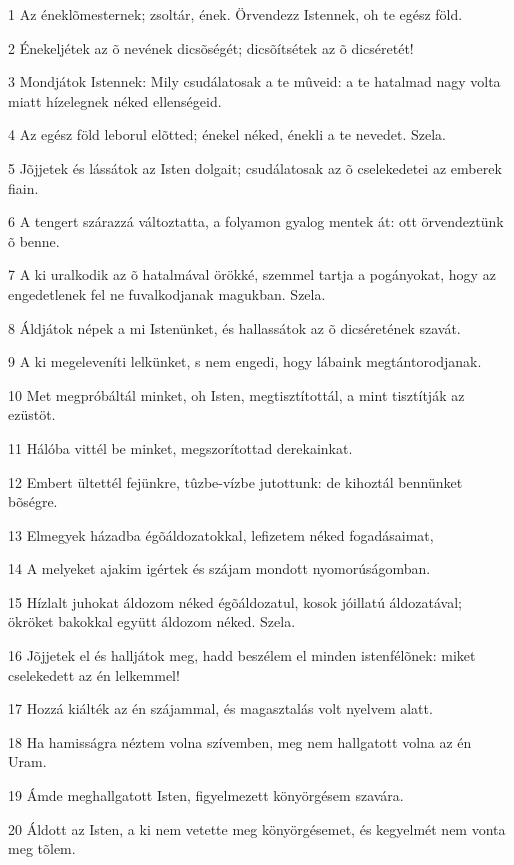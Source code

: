 \par 1 Az éneklõmesternek; zsoltár, ének. Örvendezz Istennek, oh te egész föld.
\par 2 Énekeljétek az õ nevének dicsõségét; dicsõítsétek az õ dicséretét!
\par 3 Mondjátok Istennek: Mily csudálatosak a te mûveid: a te hatalmad nagy volta miatt hízelegnek néked ellenségeid.
\par 4 Az egész föld leborul elõtted; énekel néked, énekli a te nevedet. Szela.
\par 5 Jõjjetek és lássátok az Isten dolgait; csudálatosak az õ cselekedetei az emberek fiain.
\par 6 A tengert szárazzá változtatta, a folyamon gyalog mentek át: ott örvendeztünk õ benne.
\par 7 A ki uralkodik az õ hatalmával örökké, szemmel tartja a pogányokat, hogy az engedetlenek fel ne fuvalkodjanak magukban. Szela.
\par 8 Áldjátok népek a mi Istenünket, és hallassátok az õ dicséretének szavát.
\par 9 A ki megeleveníti lelkünket, s nem engedi, hogy lábaink megtántorodjanak.
\par 10 Met megpróbáltál minket, oh Isten, megtisztítottál, a mint tisztítják az ezüstöt.
\par 11 Hálóba vittél be minket, megszorítottad derekainkat.
\par 12 Embert ültettél fejünkre, tûzbe-vízbe jutottunk: de kihoztál bennünket bõségre.
\par 13 Elmegyek házadba égõáldozatokkal, lefizetem néked fogadásaimat,
\par 14 A melyeket ajakim igértek és szájam mondott nyomorúságomban.
\par 15 Hízlalt juhokat áldozom néked égõáldozatul, kosok jóillatú áldozatával; ökröket bakokkal együtt áldozom néked. Szela.
\par 16 Jõjjetek el és halljátok meg, hadd beszélem el minden istenfélõnek: miket cselekedett az én lelkemmel!
\par 17 Hozzá kiálték az én szájammal, és magasztalás volt nyelvem alatt.
\par 18 Ha hamisságra néztem volna szívemben, meg nem hallgatott volna az én Uram.
\par 19 Ámde meghallgatott Isten, figyelmezett könyörgésem szavára.
\par 20 Áldott az Isten, a ki nem vetette meg könyörgésemet, és kegyelmét nem vonta meg tõlem.

